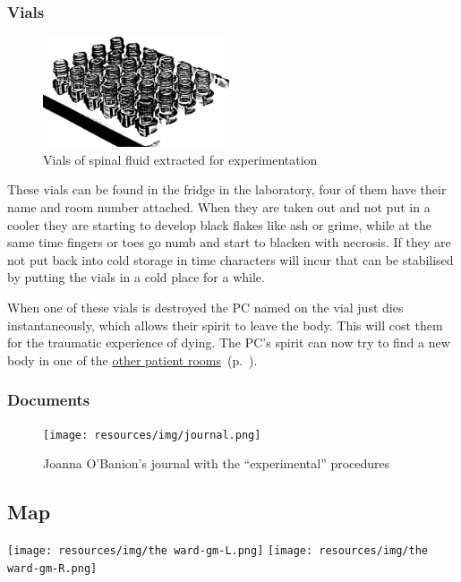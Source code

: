 \documentclass[bg-full]{resources/stylesheets/kult}
\begin{document}
\subsubsection{Vials}%
\label{ssub:vials}

\begin{figure}[!htbp]
  \centering
  \includegraphics[width=5.5cm, keepaspectratio]{resources/img/test tubes.png}
  \caption{Vials of spinal fluid extracted for experimentation}\label{vials}
\end{figure}
These vials can be found in the fridge in the laboratory, four of them have their name and room number attached.  When they are
taken out and not put in a cooler they are starting to develop black flakes like ash or grime, while at the same time fingers
or toes go numb and start to blacken with necrosis.  If they are not put back into cold storage in time characters will incur
 that can be stabilised by putting the vials in a cold place for a while.

When one of these vials is destroyed the PC named on the vial just dies instantaneously, which allows their spirit to leave the
body.  This will cost them  for the traumatic experience of dying.  The PC's spirit can now try to find a new
body in one of the \hyperref[ssub:other_patient_rooms]{other patient rooms}~(p.~\pageref{ssub:other_patient_rooms}).

\subsubsection{Documents}%
\label{ssub:documents}

\begin{figure}[!htbp]
  \centering
  \texttt{[image: resources/img/journal.png]}
  \caption{Joanna O'Banion's journal with the “experimental” procedures}\label{notebook}
\end{figure}

\clearpage %
\onecolumn
\subsection{Map}%
\label{sub:map}
\hspace*{-0.5cm}%
\texttt{[image: resources/img/the ward-gm-L.png]}
\newpage
\vspace*{0.55cm}%
\hspace*{-2.0cm}%
\texttt{[image: resources/img/the ward-gm-R.png]}
\end{document}
